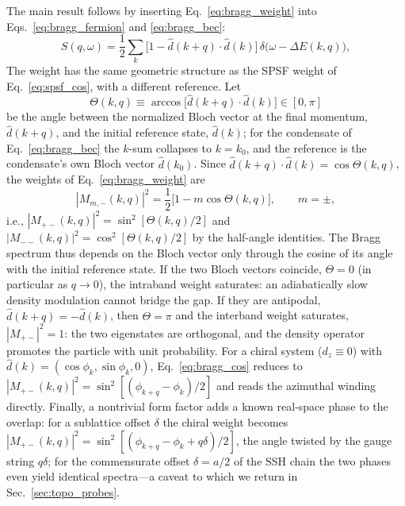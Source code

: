 \documentclass[onecolumn,aps,prl,superscriptaddress,longbibliography]{revtex4-2}
\begin{document}
The main result follows by inserting Eq.~\eqref{eq:bragg_weight} into Eqs.~\eqref{eq:bragg_fermion} and \eqref{eq:bragg_bec}:
\begin{equation}\label{eq:bragg_main}
  S(q,\omega) = \frac{1}{2}\sum_k\Big[1-\hat d(k+q)\cdot\hat d(k)\Big]\, \delta\big(\omega-\Delta E(k,q)\big),
\end{equation}
The weight has the same geometric structure as the SPSF weight of Eq.~\eqref{eq:spsf_cos}, with a different reference. Let
\begin{equation}\label{eq:bragg_angle}
  \Theta(k,q)\equiv\arccos\bigl[\hat d(k+q)\cdot\hat d(k)\bigr]\in[0,\pi]
\end{equation}
be the angle between the normalized Bloch vector at the final momentum, $\hat d(k+q)$, and the initial reference state, $\hat d(k)$; for the condensate of Eq.~\eqref{eq:bragg_bec} the $k$-sum collapses to $k=k_0$, and the reference is the condensate's own Bloch vector $\hat d(k_0)$. Since $\hat d(k+q)\cdot\hat d(k)=\cos\Theta(k,q)$, the weights of Eq.~\eqref{eq:bragg_weight} are
\begin{equation}\label{eq:bragg_cos}
  |M_{m,-}(k,q)|^2=\frac{1}{2}\bigl[1-m\cos\Theta(k,q)\bigr],
  \qquad m=\pm,
\end{equation}
i.e., $|M_{+-}(k,q)|^2=\sin^2[\Theta(k,q)/2]$ and $|M_{--}(k,q)|^2=\cos^2[\Theta(k,q)/2]$ by the half-angle identities. The Bragg spectrum thus depends on the Bloch vector only through the cosine of its angle with the initial reference state. If the two Bloch vectors coincide, $\Theta=0$ (in particular as $q\to0$), the intraband weight saturates: an adiabatically slow density modulation cannot bridge the gap. If they are antipodal, $\hat d(k+q)=-\hat d(k)$, then $\Theta=\pi$ and the interband weight saturates, $|M_{+-}|^2=1$: the two eigenstates are orthogonal, and the density operator promotes the particle with unit probability. For a chiral system ($d_z\equiv0$) with $\hat d(k)=(\cos\phi_k,\sin\phi_k,0)$, Eq.~\eqref{eq:bragg_cos} reduces to $|M_{+-}(k,q)|^2=\sin^2[(\phi_{k+q}-\phi_k)/2]$ and reads the azimuthal winding directly. Finally, a nontrivial form factor adds a known real-space phase to the overlap: for a sublattice offset $\delta$ the chiral weight becomes $|M_{+-}(k,q)|^2=\sin^2[(\phi_{k+q}-\phi_k+q\delta)/2]$, the angle twisted by the gauge string $q\delta$; for the commensurate offset $\delta=a/2$ of the SSH chain the two phases even yield identical spectra---a caveat to which we return in Sec.~\ref{sec:topo_probes}.
\end{document}
